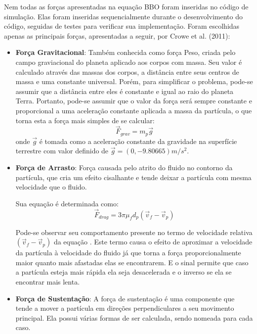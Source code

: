 Nem todas as forças apresentadas na equação BBO foram inseridas no código de simulação.
Elas foram inseridas sequencialmente durante o desenvolvimento do código, seguidas de testes para verificar sua implementação.
Foram escolhidas apenas as principais forças, apresentadas a seguir, por Crowe et al. (2011)\cite{crowe}: 
\begin{itemize}
    \item \textbf{Força Gravitacional}:
        Também conhecida como força Peso, criada pelo campo graviacional do planeta aplicado aos corpos com massa.
        Seu valor é calculado através das massas dos corpos, a distância entre seus centros de massa e uma constante universal.
        Porém, para simplificar o problema, pode-se assumir que a distância entre eles é constante e igual ao raio do planeta Terra.
        Portanto, pode-se assumir que o valor da força será sempre constante e proporcional a uma aceleração constante aplicada a massa da partícula, o que torna esta a força mais simples de se calcular:
        \begin{equation}
            \vec{F}_{grav} = m_p \vec{g}
            \label{grav}
        \end{equation}
        onde $\vec{g}$ é tomada como a aceleração constante da gravidade na superfície terrestre com valor definido de $\vec{g} = (0, -9.80665)m/s^2$.

    \item \textbf{Força de Arrasto}:
        Força causada pelo atrito do fluido no contorno da partícula, que cria um efeito cisalhante e tende deixar a partícula com mesma velocidade que o fluido.

        Sua equação é determinada como:
        \begin{equation}
            \vec{F}_{drag} = 3 \pi \mu_f d_p \left(\vec{v}_{f} - \vec{v}_{p} \right)
            \label{drag}
        \end{equation}

        Pode-se observar seu comportamento presente no termo de velocidade relativa $\left(\vec{v}_{f} - \vec{v}_{p} \right)$ da equação .
        Este termo causa o efeito de aproximar a velocidade da partícula à velocidade do fluido já que torna a força proporcionalmente maior quanto mais afastadas elas se encontrarem.
        E o sinal permite que caso a partícula esteja mais rápida ela seja desacelerada e o inverso se ela se encontrar mais lenta. 

    \item \textbf{Força de Sustentação}:
        A força de sustentação é uma componente que tende a mover a partícula em direções perpendiculares a seu movimento principal.
        Ela possui várias formas de ser calculada, sendo nomeada para cada caso.


\end{itemize}
